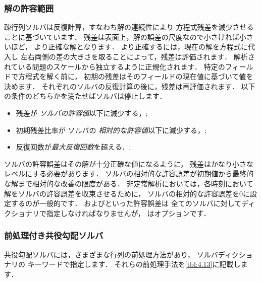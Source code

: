 \subsubsection{解の許容範囲}
\label{sssec:4.5.1.1}
疎行列ソルバは反復計算，すなわち解の連続性により
方程式残差を減少させることに基づいています．
残差は表面上，解の誤差の尺度なので小さければ小さいほど，
より正確な解となります．
より正確するには，現在の解を方程式に代入し
左右両側の差の大きさを取ることによって，残差は評価されます．
解析されている問題のスケールから独立するように正規化されます．
特定のフィールドで方程式を解く前に，
初期の残差はそのフィールドの現在値に基づいて値を決めます．
それぞれのソルバの反復計算の後に，残差は再評価されます．
以下の条件のどちらかを満たせばソルバは停止します．
\begin{itemize}
 \item 残差が
%
%
       \emph{ソルバの許容値}以下に減少する，;
 \item 初期残差比率が
%
%
       ソルバの
%
       \emph{相対的な許容値}以下に減少する，;
 \item 反復回数が\emph{最大反復回数}を超える．;
%
%
\end{itemize}
ソルバの許容誤差はその解が十分正確な値になるように，
残差はかなり小さなレベルにする必要があります．
ソルバの相対的な許容誤差が初期値から最終的な解まで相対的な改善の限度がある．
非定常解析においては，各時刻において解をソルバの許容誤差を収束させるために，
ソルバの相対的な許容誤差を$0$に設定するのが一般的です．
およびといった許容誤差は
全てのソルバに対してディクショナリで指定しなければなりませんが，
はオプションです．


\subsubsection{前処理付き共役勾配ソルバ}
\label{sssec:4.5.1.2}
共役勾配ソルバには，さまざまな行列の前処理方法があり，
ソルバディクショナリの
%
%
キーワードで指定します．
それらの前処理手法を\autoref{tbl:4.13}に記載します．


